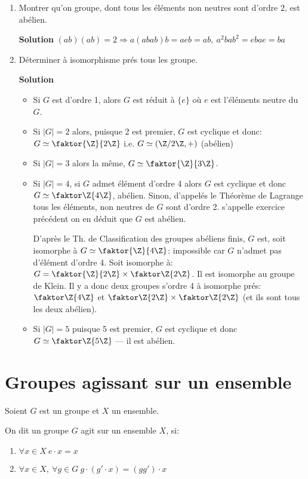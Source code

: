 \begin{exercise}
\leavevmode
	\begin{enumerate}
		\item Montrer qu'on groupe, dont tous les éléments non neutres sont d'ordre 2, est abélien.
		
		\textbf{Solution} $(ab)(ab)=2 \Rightarrow a(abab)b=aeb=ab,\ a^2bab^2=ebae=ba$
		\item Déterminer à isomorphisme prés tous les groupe.
		
		\textbf{Solution} 
		\begin{itemize}
			\item Si $G$ est d'ordre 1, alors $G$ est réduit à $\{e\}$ où $e$ est l'éléments neutre du $G$.
			\item Si $|G|=2$ alors, puisque 2 est premier, $G$ est cyclique et donc: $G\simeq \faktor{\Z}{2\Z}$ i.e. $G\simeq (\Z/2\Z, +)$ (abélien)
			\item Si $|G|=3$ alors la même, $G\simeq \faktor{\Z}{3\Z}$.
			\item Si $|G|=4$, si $G$ admet élément d'ordre 4 alors $G$ est cyclique et donc $G\simeq \faktor\Z{4\Z}$, abélien. Sinon, d'appelés le Théorème de Lagrange tous les éléments, non neutres de $G$ sont d'ordre 2. s'appelle exercice précédent on en déduit que $G$ est abélien.
			
			D'après le Th. de Classification des groupes abéliens finis, $G$ est, soit isomorphe à $G\simeq \faktor{\Z}{4\Z}$: impossible car $G$ n'admet pas d'élément d'ordre 4. Soit isomorphe à: $G=\faktor{\Z}{2\Z}\times \faktor\Z{2\Z}$. Il est isomorphe au groupe de Klein. Il y a donc deux groupes s'ordre 4 à isomorphe prés: $\faktor\Z{4\Z}$ et $\faktor\Z{2\Z}\times\faktor\Z{2\Z}$ (et ils sont tous les deux abélien).
			\item Si $|G|=5$ puisque 5 est premier, $G$ est cyclique et donc $G \simeq \faktor\Z{5\Z}$ --- il est abélien.
		\end{itemize}
	\end{enumerate}
\end{exercise}

\section{Groupes agissant sur un ensemble} %

Soient $G$ est un groupe et $X$ un ensemble.
\begin{definition}
	On dit un groupe $G$ agit sur un ensemble $X$, si:
	\begin{enumerate}
		\item $\forall x\in X\ e\cdot x= x$
		\item $\forall x\in X,\ \forall g\in G\ g\cdot(g'\cdot x)=(gg')\cdot x$
	\end{enumerate}
\end{definition}

